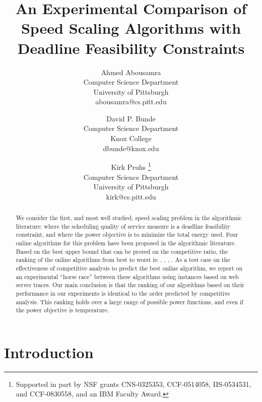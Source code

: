 \documentclass[11pt]{article}
\begin{document}
 

\title{An Experimental Comparison of Speed Scaling Algorithms with Deadline Feasibility Constraints}


\author{
Ahmed Abousamra\\
Computer Science Department\\
University of Pittsburgh\\
abousamra@cs.pitt.edu\\
\and
David P. Bunde\\
Computer Science Department\\
Knox College\\
dbunde@knox.edu\\
\and
Kirk Pruhs \thanks{ Supported in part by NSF grants CNS-0325353, CCF-0514058, IIS-0534531, and CCF-0830558, and an IBM Faculty Award.  } \\
Computer Science Department\\
University of Pittsburgh\\
kirk@cs.pitt.edu\\
}

\date{}
\maketitle



\begin{abstract}
We consider the first,
and most well studied, speed scaling problem in the
algorithmic literature:
where the scheduling quality of
service measure is a deadline feasibility constraint,
and where the power
objective is to minimize the total energy used.
Four online algorithms for this problem have been proposed in the
algorithmic literature. 
Based on the best upper bound that can be proved on the competitive ratio,
the ranking of the online algorithms from best
to worst is: , , , .
As a test case on the effectiveness of competitive analysis to
predict the best online algorithm,
we report on an experimental ``horse race'' between these algorithms
using instances based on web server traces. 
Our main conclusion is that 
the ranking of our algorithms based on their performance in our experiments is 
identical to the order predicted by
competitive analysis. This ranking holds over a large range of possible
power functions, and even if the power objective is temperature.
\end{abstract} 



\section{Introduction}
\end{document}
